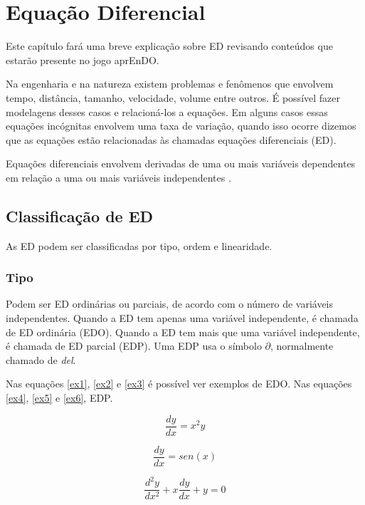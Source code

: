 \chapter[Equação diferencial]{Equação Diferencial}
Este capítulo fará uma breve explicação sobre ED revisando conteúdos que estarão presente no jogo aprEnDO.

Na engenharia e na natureza existem problemas e fenômenos que envolvem tempo, distância, tamanho, velocidade, volume entre outros. É possível fazer modelagens desses casos e relacioná-los a equações. Em alguns casos essas equações incógnitas envolvem uma taxa de variação, quando isso ocorre dizemos que as equações estão relacionadas às chamadas equações diferenciais (ED).

Equações diferenciais envolvem derivadas de uma ou mais variáveis dependentes em relação a uma ou mais variáveis independentes \cite{explicacaoEDO}.

\section[Classificação de ED]{Classificação de ED}

As ED podem ser classificadas por tipo, ordem e linearidade.

\subsection[Tipo]{Tipo}

Podem ser ED ordinárias ou parciais, de acordo com o número de variáveis independentes. Quando a ED tem apenas uma variável independente, é chamada de ED ordinária (EDO). Quando a ED tem mais que uma variável independente, é chamada de ED parcial (EDP).
Uma EDP usa o símbolo $ \partial $, normalmente chamado de \textit{del}.

Nas equações \ref{ex1}, \ref{ex2} e \ref{ex3}  é possível ver exemplos de EDO. Nas equações \ref{ex4}, \ref{ex5} e \ref{ex6}, EDP.


\begin{equation}
\label{ex1}
\dfrac{dy}{dx} = x^2y
\end{equation}
  
  
\begin{equation}
\label{ex2}
\dfrac{dy}{dx} = sen(x)
\end{equation}

\begin{equation}
\label{ex3}
\dfrac{d^2y}{dx^2} + x \dfrac{dy}{dx} + y = 0
\end{equation}


